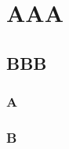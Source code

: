 \documentclass{beamer}
\begin{document}
\section{AAA}
\subsection{BBB}
\begin{frame}
  \frametitle{A}  
\end{frame}
\begin{frame}
  \frametitle{B}  
\end{frame}
\end{document}
